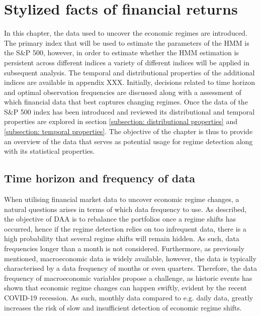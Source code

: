 \section{Stylized facts of financial returns}
\label{section: Data}
In this chapter, the data used to uncover the economic regimes are introduced. The primary index that will be used to estimate the parameters of the HMM is the S\&P 500, however, in order to estimate whether the HMM estimation is persistent across different indices a variety of different indices will be applied in subsequent analysis. The temporal and distributional properties of the additional indices are available in appendix XXX. Initially, decisions related to time horizon and optimal observation frequencies are discussed along with a assessment of which financial data that best captures changing regimes. Once the data of the S\&P 500 index has been introduced and reviewed its distributional and temporal properties are explored in section \ref{subsection: distributional properties} and \ref{subsection: temporal properties}. The objective of the chapter is thus to provide an overview of the data that serves as potential usage for regime detection along with its statistical properties.  

\subsection{Time horizon and frequency of data}
\label{subsection: Data frequency}
When utilising financial market data to uncover economic regime changes, a natural questions arises in terms of which data frequency to use. As described, the objective of DAA is to rebalance the portfolios once a regime shifts has occurred, hence if the regime detection relies on too infrequent data, there is a high probability that several regime shifts will remain hidden. As such, data frequencies longer than a month is not considered. Furthermore, as previously mentioned, macroeconomic data is widely available, however, the data is typically characterised by a data frequency of months or even quarters. Therefore, the data frequency of macroeconomic variables propose a challenge, as historic events has shown that economic regime changes can happen swiftly, evident by the recent COVID-19 recession. As such, monthly data compared to e.g. daily data, greatly increases the risk of slow and insufficient detection of economic regime shifts.
 
